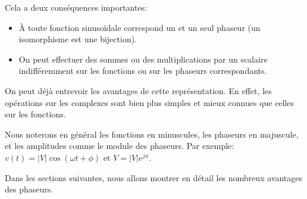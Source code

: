 Cela a deux conséquences importantes:
\begin{itemize}
    \item À toute fonction sinusoïdale correspond un et un seul phaseur
        (un isomorphisme est une bijection).
    \item On peut effectuer des sommes ou des multiplications par un scalaire
        indifféremment sur les fonctions ou sur les phaseurs correspondants.
\end{itemize}

On peut déjà entrevoir les avantages de cette représentation.
En effet,
les opérations sur les complexes sont bien plus simples et mieux connues
que celles sur les fonctions.

Nous noterons en général les fonctions en minuscules,
les phaseurs en majuscule,
et les amplitudes comme le module des phaseurs.
Par exemple: $v(t) = |V|\cos(\omega t + \phi)$ et
$V = |V|e^{j\phi}$.

Dans les sections suivantes, nous allons montrer en détail
les nombreux avantages des phaseurs.
